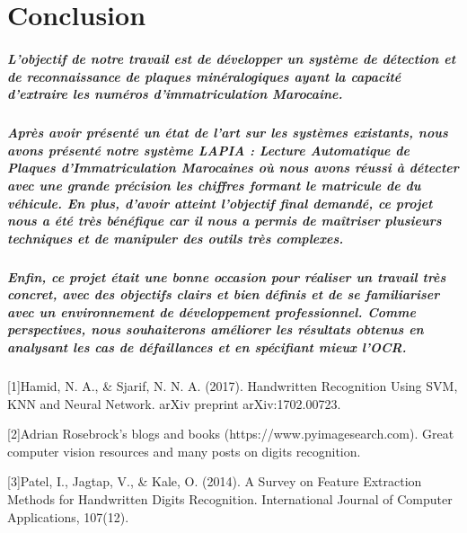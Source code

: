 \documentclass[11pt]{report}
\begin{document}
%
%
\chapter*{Conclusion}

\paragraph{
L’objectif de notre travail est de développer un système de détection et de
reconnaissance de plaques minéralogiques ayant la capacité d’extraire les numéros
d’immatriculation Marocaine.}
\paragraph{
Après avoir présenté un état de l’art sur les systèmes existants, nous avons
présenté notre système LAPIA : Lecture Automatique de Plaques d’Immatriculation
Marocaines où nous avons réussi à détecter avec une grande précision les chiffres formant
le matricule de du véhicule.
En plus, d’avoir atteint l’objectif final demandé, ce projet nous a été très bénéfique
car il nous a permis de maîtriser plusieurs techniques et de manipuler des outils très
complexes.
}
\paragraph{
Enfin, ce projet était une bonne occasion pour réaliser un travail très concret, avec
des objectifs clairs et bien définis et de se familiariser avec un environnement de
développement professionnel.
Comme perspectives, nous souhaiterons améliorer les résultats obtenus en
analysant les cas de défaillances et en spécifiant mieux l’OCR.
}






%
%
\newpage

	

\thispagestyle{empty}


[1]Hamid, N. A., \& Sjarif, N. N. A. (2017). Handwritten Recognition Using SVM, KNN and Neural Network. arXiv preprint arXiv:1702.00723.

[2]Adrian Rosebrock’s blogs and books (https://www.pyimagesearch.com). Great computer vision resources and many posts on digits recognition.

[3]Patel, I., Jagtap, V., \& Kale, O. (2014). A Survey on Feature Extraction Methods for Handwritten Digits Recognition. International Journal of Computer Applications, 107(12).
\newpage

\appendix
\end{document}

